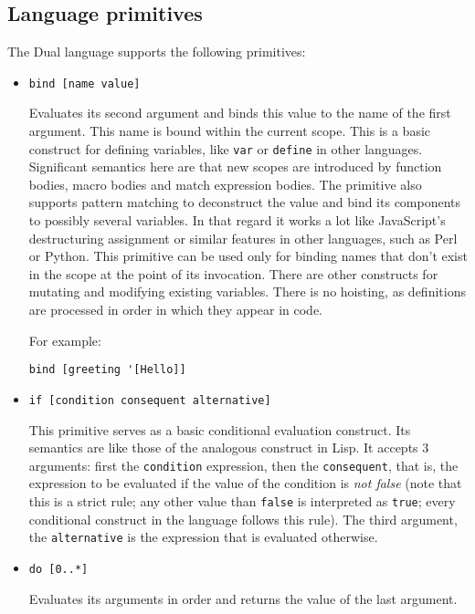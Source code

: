 \subsection{Language primitives}\label{sub:primitives}
The Dual language supports the following primitives:
\begin{itemize}
    \item \texttt{bind [name value]}
    
    Evaluates its second argument and binds this value to the name of the first
    argument. This name is bound within the current scope. This is a basic
    construct for defining variables, like \texttt{var} or \texttt{define} in
    other languages. Significant semantics here are that new scopes are
    introduced by function bodies, macro bodies and match expression bodies. The
    primitive also supports pattern matching to deconstruct the value and bind
    its components to possibly several variables. In that regard it works a lot
    like JavaScript's destructuring
    assignment\cite{mdn_destructuring}
    or similar features in other languages, such as Perl or Python. This
    primitive can be used only for binding names that don't exist in the scope
    at the point of its invocation. There are other constructs for mutating and
    modifying existing variables. There is no
    hoisting\cite[Section~var hoisting]{mdn_var},
    as definitions are processed in order in which they appear in code.
    
    For example:
\begin{lstlisting}
bind [greeting '[Hello]]
\end{lstlisting}
    
    \item \texttt{if [condition consequent alternative]}
    
    This primitive serves as a basic conditional evaluation construct. Its
    semantics are like those of the analogous construct in Lisp. It accepts 3
    arguments: first the \texttt{condition} expression, then the
    \texttt{consequent}, that is, the expression to be evaluated if the value of
    the condition is \textit{not false} (note that this is a strict rule; any
    other value than \texttt{false} is interpreted as \texttt{true}; every
    conditional construct in the language follows this rule). The third
    argument, the \texttt{alternative} is the expression that is evaluated
    otherwise.
    \item \texttt{do [0..*]}
        
    Evaluates its arguments in order and returns the value of the last argument.
    

\end{itemize}

